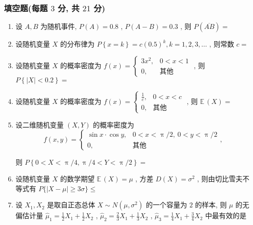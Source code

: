 \documentclass[cn,11pt,fancy,hide]{elegantbook}
\newcommand{\EE}{\mathbb{E}\,}
\renewcommand{\leq}{\leqslant}
\renewcommand{\geq}{\geqslant}
\begin{document}
\subsubsection{填空题(每题 $3$ 分, 共 $21$ 分)}
\begin{enumerate}
	\item 设 $A,B$ 为随机事件, $P(A)=0.8$ , $P(A-B)=0.3$ , 则 $P\left(\overline{AB}\right)=$\underline{\hspace{8pc}}
	
	\item 设随机变量 $X$ 的分布律为 $P\left\{x=k\right\}=c(0.5)^k,k=1,2,3,\ldots$ , 则常数 $c=$\underline{\hspace{8pc}}
	
	\item 设随机变量 $X$ 的概率密度为 $f(x)=
	\begin{cases}
	3x^2, & 0<x<1\\
	0, & \text{其他}
	\end{cases}
	$ , 则 $P\left\{\left|X\right|<0.2\right\}=$\underline{\hspace{8pc}}
	
	\item 设随机变量 $X$ 的概率密度为 $f(x)=
	\begin{cases}
	\frac{1}{c}, & 0<x<c\\
	0, & \text{其他}
	\end{cases}
	$ , 则 $\EE(X)=$\underline{\hspace{8pc}}
	
	\item 设二维随机变量 $(X,Y)$ 的概率密度为
	\begin{equation*}
		f(x,y)=
		\begin{cases}
		\sin x\cdot\cos y, & 0<x<\uppi/2,\ 0<y<\uppi/2\\
		0, & \text{其他}
		\end{cases}
		,
	\end{equation*}
	
	则 $P\left\{0<X<\uppi/4,\uppi/4<Y<\uppi/2\right\}=$\underline{\hspace{8pc}}
	
	\item 设随机变量 $X$ 的数学期望 $\EE(X)=\mu$ , 方差 $D(X)=\sigma^2$ , 则由切比雪夫不等式有 $P\{|X-\mu|\geq3\sigma\}\leq$\underline{\hspace{8pc}}
	
	\item 设 $X_1,X_2$ 是取自正态总体 $X\sim N\left(\mu,\sigma^2\right)$ 的一个容量为 $2$ 的样本, 则 $\mu$ 的无偏估计量 $\hat\mu_1=\frac{1}{2}X_1+\frac{1}{2}X_2$ , $\hat\mu_2=\frac{2}{3}X_1+\frac{1}{3}X_2$ , $\hat\mu_3=\frac{1}{4}X_1+\frac{3}{4}X_2$ 中最有效的是\underline{\hspace{8pc}}
\end{enumerate}
\end{document}
